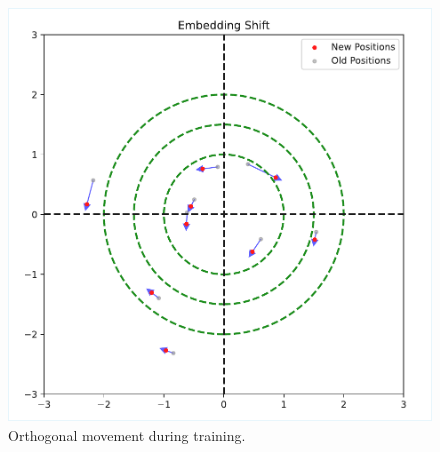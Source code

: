 \begin{figure}[!htbp]
\centering
\includegraphics[width=.95\columnwidth]{../draft_materials/figure_2_paper.pdf}
\caption{Orthogonal movement during training.}
\label{fig:cos-orth}
\end{figure}

